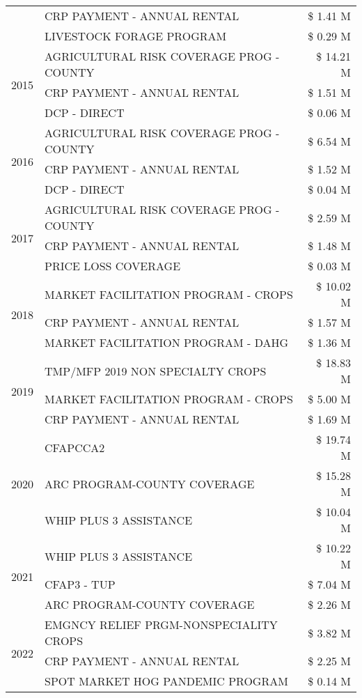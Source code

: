 \begin{tabular}{llr}
 & CRP PAYMENT - ANNUAL RENTAL & \$ 1.41 M \\
 & LIVESTOCK FORAGE PROGRAM & \$ 0.29 M \\
\cline{1-3}
\multirow[t]{3}{*}{2015} & AGRICULTURAL RISK COVERAGE PROG - COUNTY & \$ 14.21 M \\
 & CRP PAYMENT - ANNUAL RENTAL & \$ 1.51 M \\
 & DCP - DIRECT & \$ 0.06 M \\
\cline{1-3}
\multirow[t]{3}{*}{2016} & AGRICULTURAL RISK COVERAGE PROG - COUNTY & \$ 6.54 M \\
 & CRP PAYMENT - ANNUAL RENTAL & \$ 1.52 M \\
 & DCP - DIRECT & \$ 0.04 M \\
\cline{1-3}
\multirow[t]{3}{*}{2017} & AGRICULTURAL RISK COVERAGE PROG - COUNTY & \$ 2.59 M \\
 & CRP PAYMENT - ANNUAL RENTAL & \$ 1.48 M \\
 & PRICE LOSS COVERAGE & \$ 0.03 M \\
\cline{1-3}
\multirow[t]{3}{*}{2018} & MARKET FACILITATION PROGRAM - CROPS & \$ 10.02 M \\
 & CRP PAYMENT - ANNUAL RENTAL & \$ 1.57 M \\
 & MARKET FACILITATION PROGRAM - DAHG & \$ 1.36 M \\
\cline{1-3}
\multirow[t]{3}{*}{2019} & TMP/MFP 2019 NON SPECIALTY CROPS & \$ 18.83 M \\
 & MARKET FACILITATION PROGRAM - CROPS & \$ 5.00 M \\
 & CRP PAYMENT - ANNUAL RENTAL & \$ 1.69 M \\
\cline{1-3}
\multirow[t]{3}{*}{2020} & CFAPCCA2 & \$ 19.74 M \\
 & ARC PROGRAM-COUNTY COVERAGE & \$ 15.28 M \\
 & WHIP PLUS 3 ASSISTANCE & \$ 10.04 M \\
\cline{1-3}
\multirow[t]{3}{*}{2021} & WHIP PLUS 3 ASSISTANCE & \$ 10.22 M \\
 & CFAP3 - TUP & \$ 7.04 M \\
 & ARC PROGRAM-COUNTY COVERAGE & \$ 2.26 M \\
\cline{1-3}
\multirow[t]{3}{*}{2022} & EMGNCY RELIEF PRGM-NONSPECIALITY CROPS & \$ 3.82 M \\
 & CRP PAYMENT - ANNUAL RENTAL & \$ 2.25 M \\
 & SPOT MARKET HOG PANDEMIC PROGRAM & \$ 0.14 M \\
\cline{1-3}
\bottomrule
\end{tabular}
